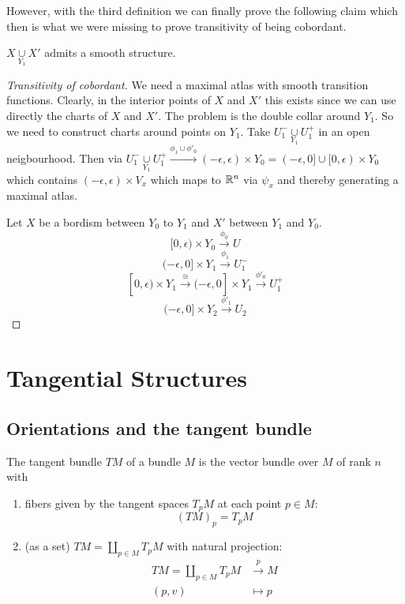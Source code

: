 However, with the third definition we can finally prove the following claim which then is what we were missing to prove transitivity of being cobordant.
\begin{clm}\label{GluedManifoldsBordisms}
    $X\underset{Y_1}{\cup} X'$ admits a smooth structure.
\end{clm}
\begin{proof}[Transitivity of cobordant]\label{BordantTransitive}
    We need a maximal atlas with smooth transition functions. Clearly, in the interior points of $X$ and $X'$ this exists since we can use directly the charts of $X$ and $X'$. The problem is the double collar around $Y_1$. So we need to construct charts around points on $Y_1$. Take $U_1^{-}\underset{Y_1}{\cup}U_1^{+}$ in an open neigbourhood. Then via $U_1^{-}\underset{Y_1}{\cup}U_1^{+}\xrightarrow{\phi_1\cup\phi'_0}(-\epsilon,\epsilon)\times Y_0=(-\epsilon,0]\cup[0,\epsilon)\times Y_0$ which contains $(-\epsilon,\epsilon)\times V_x$ which maps to $\mathbb{R}^n$ via $\psi_x$ and thereby generating a maximal atlas.

Let $X$ be a bordism between $Y_0$ to $Y_1$ and $X'$ between $Y_1$ and $Y_0$.
$$[0, \epsilon)\times Y_0\xrightarrow{\phi_0}U$$
$$(-\epsilon,0]\times Y_1\xrightarrow{\phi_1}U_1^{-}$$
$$[0,\epsilon)\times Y_1\xrightarrow{\cong}(-\epsilon,0]\times Y_1\xrightarrow{\phi'_0}U_1^{+}$$
$$(-\epsilon,0]\times Y_2\xrightarrow{\phi'_1}U_2$$
\end{proof}

\section{Tangential Structures}
\subsection{Orientations and the tangent bundle}
\begin{defn}
    The tangent bundle $TM$ of a bundle $M$ is the vector bundle over $M$ of rank $n$ with
    \begin{enumerate}
        \item fibers given by the tangent spaces $T_p M$ at each point $p \in M$: $$(TM)_p=T_pM$$
        \item (as a set) $TM=\coprod_{p\in M} T_p M$ with natural projection: 
        \begin{align}
            TM=\coprod_{p\in M} T_p M&\xrightarrow{p}M \\
            (p,v)&\mapsto p
        \end{align}
    \end{enumerate}
\end{defn}


